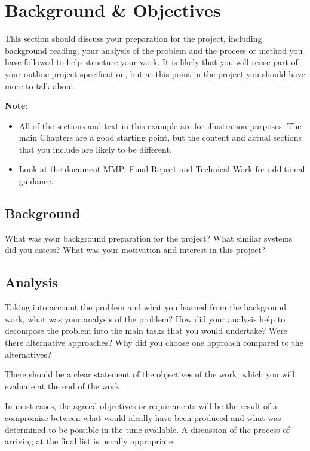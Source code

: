 \chapter{Background \& Objectives}

This section should discuss your preparation for the project, including background
reading, your analysis of the problem and the process or method you have followed
to help structure your work.  It is likely that you will reuse part of your outline
project specification, but at this point in the project you should have more to talk about.

\textbf{Note}:

\begin{itemize}
   \item All of the sections and text in this example are for illustration purposes.
   The main Chapters are a good starting point, but the content and actual sections
   that you include are likely to be different.

   \item Look at the document MMP: Final Report and Technical Work \cite{FinalReportTechicalWork} for additional guidance.

\end {itemize}

\section{Background}
What was your background preparation for the project? What similar systems did
you assess? What was your motivation and interest in this project?

\section{Analysis}
Taking into account the problem and what you learned from the background work,
what was your analysis of the problem? How did your analysis help to decompose
the problem into the main tasks that you would undertake? Were there alternative
approaches? Why did you choose one approach compared to the alternatives?

There should be a clear statement of the objectives of the work, which you will
evaluate at the end of the work.

In most cases, the agreed objectives or requirements will be the result of a compromise
between what would ideally have been produced and what was determined to be possible in
 the time available. A discussion of the process of arriving at the final list is usually appropriate.

